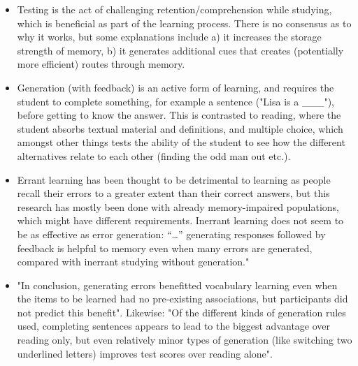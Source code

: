 \begin{itemize}

\item Testing is the act of challenging retention/comprehension while studying,
  which is beneficial as part of the learning process. There is no consensus as
  to why it works, but some explanations include a) it increases the storage
  strength of memory, b) it generates additional cues that creates (potentially
  more efficient) routes through memory.\cite[p.6]{potts2014benefit}

\item Generation (with feedback) is an active form of learning, and requires the
  student to complete something, for example a sentence ("Lisa is a \_\_\_"),
  before getting to know the answer. This is contrasted to reading, where the
  student absorbs textual material and definitions, and multiple choice, which
  amongst other things tests the ability of the student to see how the different
  alternatives relate to each other (finding the odd man out etc.).

\item Errant learning has been thought to be detrimental to learning as people
  recall their errors to a greater extent than their correct
  answers\cite{potts2014benefit}, but this research has mostly been done with
  already memory-impaired populations, which might have different requirements.
  Inerrant learning does not seem to be as effective as error generation: 
  ``\dots'' generating responses followed by feedback is helpful to memory 
  even when many errors are generated, compared with inerrant studying without
  generation."\cite[p.54]{potts2014benefit}

\item "In conclusion, generating errors benefitted vocabulary learning even when
  the items to be learned had no pre-existing associations, but participants did
  not predict this benefit"\cite[p.54]{potts2014benefit}. Likewise: "Of the
  different kinds of generation rules used, completing sentences appears to lead
  to the biggest advantage over reading only, but even relatively minor types of
  generation (like switching two underlined letters) improves test scores over
  reading alone"\cite[p.73]{benassi2014applying}.

\end{itemize}

